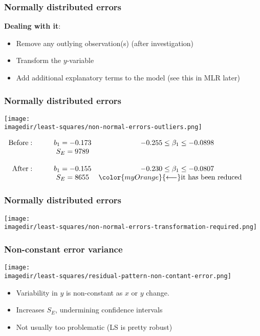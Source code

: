 \begin{frame}\frametitle{Normally distributed errors}

	\textbf{Dealing with it}:
	\begin{itemize}
		\item	Remove any outlying observation(s) (after investigation)
		\item	Transform the $y$-variable
		\item	Add additional explanatory terms to the model (see this in MLR later)
	\end{itemize}
\end{frame}

\begin{frame}\frametitle{Normally distributed errors}
	\begin{center}
		\texttt{[image: \\imagedir/least-squares/non-normal-errors-outliers.png]}
	\end{center}
	$
	\begin{array}{rcccl}
		\text{Before}: \qquad & b_1 = -0.173 & \qquad -0.255 \leq \beta_1 \leq -0.0898 \\
		& S_E = 9789\\ \\
		\text{After}: \qquad & b_1 = -0.155 & \qquad -0.230 \leq \beta_1 \leq -0.0807 \\
		&S_E = 8655 & {\color{myOrange}{\longleftarrow} \text{it has been reduced}}
	\end{array}
	$
\end{frame}

\begin{frame}\frametitle{Normally distributed errors}
	\begin{center}
		\texttt{[image: \\imagedir/least-squares/non-normal-errors-transformation-required.png]}
	\end{center}
\end{frame}

\begin{frame}\frametitle{Non-constant error variance}
	\begin{center}
		\texttt{[image: \\imagedir/least-squares/residual-pattern-non-contant-error.png]}
	\end{center}
	\begin{itemize}
		\item	Variability in $y$ is non-constant as $x$ or $y$ change.
		\item	Increases $S_E$, undermining confidence intervals
		\item	Not usually too problematic (LS is pretty robust)
	\end{itemize}
\end{frame}

